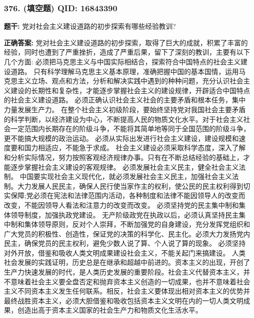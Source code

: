 \documentclass[12pt,UTF8]{ctexart}
\begin{document}
\vspace{0.3em}\hrulefill\vspace{0.7em}

\subsubsection*{376. (填空题) \small QID: 16843390}

\textbf{题干:}
党对社会主义建设道路的初步探索有哪些经验教训?

\textbf{正确答案:}
党对社会主义建设道路的初步探索，取得了巨大的成就，积累了丰富的经验，同时也遭到了严重挫折，造成了严重后果，留下了深刻的教训，主要有以下几个方面:
必须把马克思主义与中国实际相结合，探索符合中国特点的社会主义建设道路。
只有科学理解马克思主义基本原理，准确把握中国的基本国情，运用马克思主义立场、观点和方法，分析和解决实践中遇到的种种问题，充分认识社会主义建设的长期性和复杂性，才能逐步掌握社会主义的建设规律，开辟适合中国特点的社会主义建设道路。
必须正确认识社会主义社会的主要矛盾和根本任务，集中力量发展生产力。
在整个社会主义初级阶段，要始终坚持党对我国社会主要矛盾的科学判断，以经济建设为中心，不断提高人民的物质文化水平。对于社会主义社会一定范围内长期存在的阶级斗争，不能将其简单地等同于全国范围的阶级斗争，更不能搞大规模的政治运动。
必须从实际出发进行社会主义建设，建设规模和速度要和国力相适应，不能急于求成。
社会主义建设必须采取科学态度，深入了解和分析实际情况，努力按照客观经济规律办事。只有在不断总结经验的基础上，才能逐步掌握社会主义建设的客观规律。
必须发展社会主义民主，健全社会主义法制。
中国要实现社会主义现代化，就必须发展社会主义民主，加强社会主义法制。大力发展人民民主，确保人民行使当家作主的权利，使公民的民主权利得到切实保障;党必须在宪法和法律范围内活动，各种制度和法律不能因领导人的改变而改变，不能因领导人看法和注意力的改变而改变。
必须坚持党的民主集中制和集体领导制度，加强执政党建设。
无产阶级政党在执政以后，必须认真坚持民主集中制和集体领导原则，反对个人崇拜，不断加强党的自身建设，充分发挥党组织和广大党员的积极性、创造性，保证党的决策的科学化、民主化。必须大力发扬党内民主，确保党员的民主权利，避免少数人说了算、个人说了算的现象。
必须坚持对外开放，借鉴和吸收人类文明成果建设社会主义，不能关起门来搞建设。
人类社会发展的实践证明，历史总是在继承和超越中前进的。资本主义的出现，开创了生产力快速发展的时代，是人类历史发展的重要阶段。社会主义代替资本主义，并不意味着社会主义要全盘否定和抛弃资本主义创造的一切成果，也并不意味着社会主义不同资本主义发生任何联系。相反，社会主义要体现出相对资本主义的优势并最终战胜资本主义，必须大胆借鉴和吸收包括资本主义文明在内的一切人类文明成果，创造出高于资本主义国家的社会生产力和物质文化生活水平。
\end{document}
